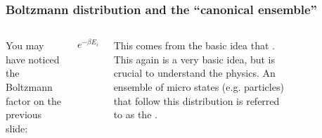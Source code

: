 \documentclass[hyperref={colorlinks=true}]{beamer}
\begin{document}
\begin{frame}%
  \frametitle{Boltzmann distribution and the ``canonical ensemble''}
  
  \begin{columns}
  
  
  You may have noticed the Boltzmann factor on the previous slide:
  
  \begin{equation}
    e^{-\beta E_i}
  \end{equation} 

  \pause

  This comes from the basic idea that . This again is a very basic idea, but is crucial to understand the physics. An ensemble of micro states (e.g. particles) that follow this distribution is referred to as the . 
  
  
    \pause
  
    \begin{figure}
      \centering
    \end{figure}
  
  \end{columns}

  \pause 
  
  \centering {}

\end{frame}

\end{document}
